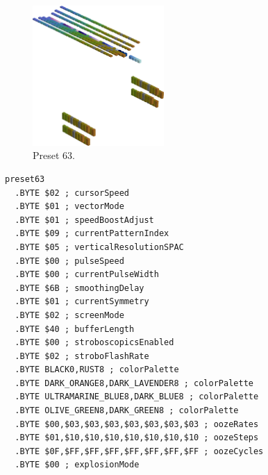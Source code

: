 \begin{minipage}[b]{0.48\linewidth}
\begin{figure}[H]                                                          
  \centering                                                             
  \begin{adjustbox}{width=5cm,center}                                   
  \includegraphics[width=5cm]{src/colorspace_presets/preset63-45.png}%
  \end{adjustbox}                                                        
\caption*{Preset 63.}                                           
\end{figure}                                                               
\end{minipage}
\hspace{0.1cm}
\begin{minipage}[b]{0.48\linewidth}                            
\begin{lstlisting}[basicstyle=\ttfamily\tiny]
preset63
  .BYTE $02 ; cursorSpeed
  .BYTE $01 ; vectorMode
  .BYTE $01 ; speedBoostAdjust
  .BYTE $09 ; currentPatternIndex
  .BYTE $05 ; verticalResolutionSPAC
  .BYTE $00 ; pulseSpeed
  .BYTE $00 ; currentPulseWidth
  .BYTE $6B ; smoothingDelay
  .BYTE $01 ; currentSymmetry
  .BYTE $02 ; screenMode
  .BYTE $40 ; bufferLength
  .BYTE $00 ; stroboscopicsEnabled
  .BYTE $02 ; stroboFlashRate
  .BYTE BLACK0,RUST8 ; colorPalette
  .BYTE DARK_ORANGE8,DARK_LAVENDER8 ; colorPalette
  .BYTE ULTRAMARINE_BLUE8,DARK_BLUE8 ; colorPalette
  .BYTE OLIVE_GREEN8,DARK_GREEN8 ; colorPalette
  .BYTE $00,$03,$03,$03,$03,$03,$03,$03 ; oozeRates
  .BYTE $01,$10,$10,$10,$10,$10,$10,$10 ; oozeSteps
  .BYTE $0F,$FF,$FF,$FF,$FF,$FF,$FF,$FF ; oozeCycles
  .BYTE $00 ; explosionMode
\end{lstlisting}
\end{minipage}

\vspace*{0.3cm}

